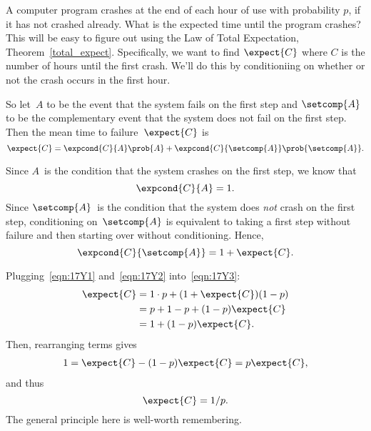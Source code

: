A computer program crashes at the end of each hour of use with
probability $p$, if it has not crashed already.  What is the expected
time until the program crashes?  This will be easy to figure out using
the  Law of Total Expectation,
Theorem~\ref{total_expect}.  Specifically, we want to find
$\expect{C}$ where $C$ is the number of hours until the first crash.
We'll do this by conditioniing on whether or not the crash occurs in
the first hour.

So let~$A$ to be the event that the system fails on the first step and
$\setcomp{A}$ to be the complementary event that the system does not fail
on the first step.  Then the mean time to failure~$\expect{C}$ is
\begin{equation}\label{eqn:17Y3}
    \expect{C} = \expcond{C}{A} \prob{A} + \expcond{C}{\setcomp{A}} \prob{\setcomp{A}}.
\end{equation}

Since $A$~is the condition that the system crashes on the first
step, we know that
\begin{equation}\label{eqn:17Y1}
    \expcond{C}{A} = 1.
\end{equation}
Since $\setcomp{A}$~is the condition that the system does \emph{not} crash on
the first step, conditioning on~$\setcomp{A}$ is equivalent to taking a first
step without failure and then starting over without conditioning.
Hence,
\begin{equation}\label{eqn:17Y2}
    \expcond{C}{\setcomp{A}} = 1 + \expect{C}.
\end{equation}

Plugging~\eqref{eqn:17Y1} and~\eqref{eqn:17Y2} into~\eqref{eqn:17Y3}:
\begin{align*}
\expect{C}
    &= 1 \cdot p + (1 + \expect{C}) (1 - p) \\
    &= p + 1 - p + (1 - p) \expect{C} \\
    &= 1 + (1 - p) \expect{C}.
\end{align*}
Then, rearranging terms gives
\begin{align*}
    1   = \expect{C} - (1 - p) \expect{C} %
        = p \expect{C},
\end{align*}
and thus 
\[
\expect{C} = 1/p.
\]
The general principle here is well-worth remembering.



